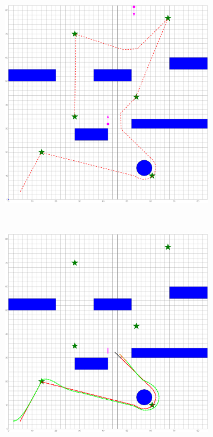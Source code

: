 \documentclass[letterpaper, 10 pt, conference]{ieeeconf}
\begin{document}
	\begin{figure}
		\centering
		\begin{subfigure}{0.2\textwidth}
			\includegraphics[width=\textwidth]{figures/ref_traj_end}
			\caption{}
			\label{fig:ref_traj_obs1}
		\end{subfigure}
		~
		\begin{subfigure}{0.2\textwidth}
			\includegraphics[width=\textwidth]{figures/sim_traj_obs1}

\end{subfigure}
\end{figure}
\end{document}
